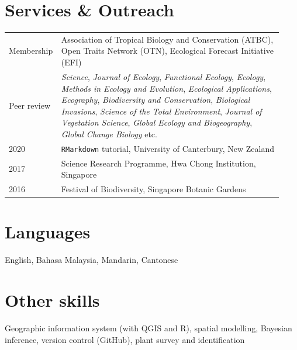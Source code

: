 \documentclass[a4paper]{article}
\begin{document}
\section*{Services \& Outreach}
\begin{tabular}{p{0.13\linewidth} p{0.8\linewidth}}
Membership & Association of Tropical Biology and Conservation (ATBC), Open Traits Network (OTN), Ecological Forecast Initiative (EFI) \\
Peer review & \textit{Science}, \textit{Journal of Ecology}, \textit{Functional Ecology}, \textit{Ecology}, \textit{Methods in Ecology and Evolution}, \textit{Ecological Applications}, \textit{Ecography}, \textit{Biodiversity and Conservation}, \textit{Biological Invasions}, \textit{Science of the Total Environment}, \textit{Journal of Vegetation Science}, \textit{Global Ecology and Biogeography}, \textit{Global Change Biology} etc.\\
2020 & \texttt{RMarkdown} tutorial, University of Canterbury, New Zealand \\
2017 & Science Research Programme, Hwa Chong Institution, Singapore \\
2016 & Festival of Biodiversity, Singapore Botanic Gardens \\
\end{tabular}


\section*{Languages}
English, Bahasa Malaysia, Mandarin, Cantonese


\section*{Other skills}
Geographic information system (with QGIS and R), spatial modelling, Bayesian inference, version control (GitHub), plant survey and identification
\end{document}

